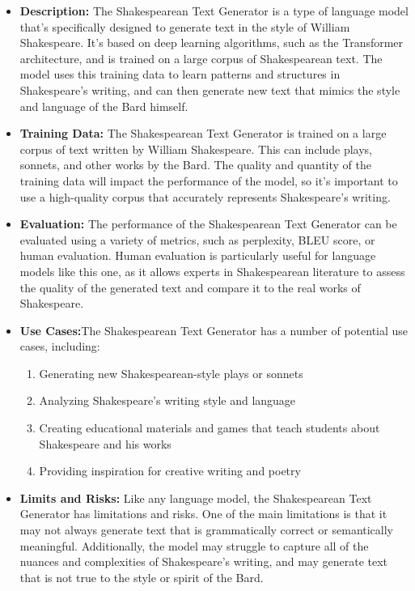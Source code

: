 \begin{itemize}
\item \textbf{Description:} The Shakespearean Text Generator is a type of language model that's specifically designed to generate text in the style of William Shakespeare. It's based on deep learning algorithms, such as the Transformer architecture, and is trained on a large corpus of Shakespearean text. The model uses this training data to learn patterns and structures in Shakespeare's writing, and can then generate new text that mimics the style and language of the Bard himself.
\item \textbf{Training Data:} The Shakespearean Text Generator is trained on a large corpus of text written by William Shakespeare. This can include plays, sonnets, and other works by the Bard. The quality and quantity of the training data will impact the performance of the model, so it's important to use a high-quality corpus that accurately represents Shakespeare's writing.
\item \textbf{Evaluation:} The performance of the Shakespearean Text Generator can be evaluated using a variety of metrics, such as perplexity, BLEU score, or human evaluation. Human evaluation is particularly useful for language models like this one, as it allows experts in Shakespearean literature to assess the quality of the generated text and compare it to the real works of Shakespeare.
\item \textbf{Use Cases:}The Shakespearean Text Generator has a number of potential use cases, including:
    \begin{enumerate}
        \item Generating new Shakespearean-style plays or sonnets
        \item Analyzing Shakespeare's writing style and language
        \item Creating educational materials and games that teach students about Shakespeare and his works
        \item Providing inspiration for creative writing and poetry
        \end{enumerate}
\item \textbf{Limits and Risks:} Like any language model, the Shakespearean Text Generator has limitations and risks. One of the main limitations is that it may not always generate text that is grammatically correct or semantically meaningful. Additionally, the model may struggle to capture all of the nuances and complexities of Shakespeare's writing, and may generate text that is not true to the style or spirit of the Bard.

\end{itemize}
